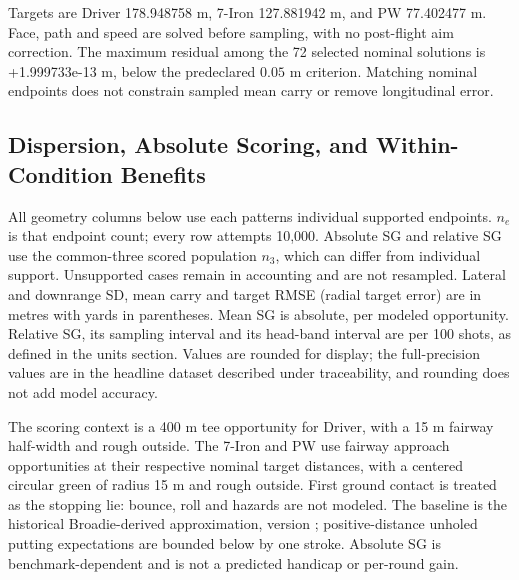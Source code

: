 \documentclass[11pt,letterpaper]{article}
\newcommand{\numtext}[1]{\textnormal{#1}}
\begin{document}


Targets are Driver 178.948758 m, 7-Iron 127.881942 m, and PW 77.402477 m. Face, path and speed are solved before sampling, with no post-flight aim correction. The maximum residual among the 72 selected nominal solutions is \numtext{+1.999733e-13} m, below the predeclared $0.05$ m criterion. Matching nominal endpoints does not constrain sampled mean carry or remove longitudinal error.

\subsection{Dispersion, Absolute Scoring, and Within-Condition Benefits}

All geometry columns below use each pattern\textquotesingle s individual supported endpoints. $n_e$ is that endpoint count; every row attempts 10,000. Absolute SG and relative SG use the common-three scored population $n_3$, which can differ from individual support. Unsupported cases remain in accounting and are not resampled. Lateral and downrange SD, mean carry and target RMSE (radial target error) are in metres with yards in parentheses. Mean SG is absolute, per modeled opportunity. Relative SG, its sampling interval and its head-band interval are per 100 shots, as defined in the units section. Values are rounded for display; the full-precision values are in the headline dataset described under traceability, and rounding does not add model accuracy.










The scoring context is a 400 m tee opportunity for Driver, with a 15 m fairway half-width and rough outside. The 7-Iron and PW use fairway approach opportunities at their respective nominal target distances, with a centered circular green of radius 15 m and rough outside. First ground contact is treated as the stopping lie: bounce, roll and hazards are not modeled. The baseline is the historical Broadie-derived approximation, version ; positive-distance unholed putting expectations are bounded below by one stroke. Absolute SG is benchmark-dependent and is not a predicted handicap or per-round gain.
\end{document}
